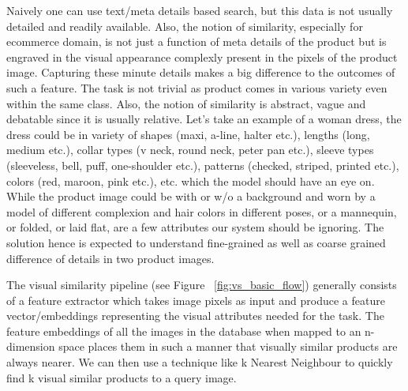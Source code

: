 \documentclass[10pt,twocolumn,letterpaper]{article}
\begin{document}
Naively one can use text/meta details based search, but this data is not usually detailed and readily available. Also, the notion of similarity, especially for ecommerce domain, is not just a function of meta details of the product but is engraved in the visual appearance complexly present in the pixels of the product image. Capturing these minute details makes a big difference to the outcomes of such a feature. The task is not trivial as product comes in various variety even within the same class. Also, the notion of similarity is abstract, vague and debatable since it is usually relative. Let's take an example of a woman dress, the dress could be in variety of shapes (maxi, a-line, halter etc.), lengths (long, medium etc.), collar types (v neck, round neck, peter pan etc.), sleeve types (sleeveless, bell, puff, one-shoulder etc.), patterns (checked, striped, printed etc.), colors (red, maroon, pink etc.), etc. which the model should have an eye on. While the product image could be with or w/o a background and worn by a model of different complexion and hair colors in different poses, or a mannequin, or folded, or laid flat, are a few attributes our system should be ignoring. The solution hence is expected to understand fine-grained as well as coarse grained difference of details in two product images.

The visual similarity pipeline (see Figure ~\ref{fig:vs_basic_flow}) generally consists of a feature extractor which takes image pixels as input and produce a feature vector/embeddings representing the visual attributes needed for the task. The feature embeddings of all the images in the database when mapped to an n-dimension space places them in such a manner that visually similar products are always nearer. We can then use a technique like k Nearest Neighbour to quickly find k visual similar products to a query image.
\end{document}
